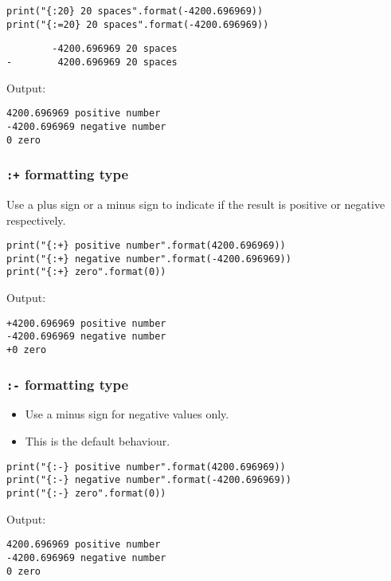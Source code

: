 \documentclass[11pt]{article}
\begin{document}
\begin{verbatim}
print("{:20} 20 spaces".format(-4200.696969))
print("{:=20} 20 spaces".format(-4200.696969))
\end{verbatim}

\begin{verbatim}
        -4200.696969 20 spaces
-        4200.696969 20 spaces
\end{verbatim}


 \noindent Output:

\begin{verbatim}
4200.696969 positive number
-4200.696969 negative number
0 zero
\end{verbatim}

\subsubsection{\texttt{:+} formatting type}
\label{sec:org0a3a92e}
Use a plus sign or a minus sign to indicate if the result is positive or negative respectively.

\begin{verbatim}
print("{:+} positive number".format(4200.696969))
print("{:+} negative number".format(-4200.696969))
print("{:+} zero".format(0))
\end{verbatim}

 \noindent Output:

\begin{verbatim}
+4200.696969 positive number
-4200.696969 negative number
+0 zero
\end{verbatim}

\subsubsection{\texttt{:-} formatting type}
\label{sec:orga4ec057}
\begin{itemize}
\item Use a minus sign for negative values only.
\item This is the default behaviour.
\end{itemize}

\begin{verbatim}
print("{:-} positive number".format(4200.696969))
print("{:-} negative number".format(-4200.696969))
print("{:-} zero".format(0))
\end{verbatim}

 \noindent Output:

\begin{verbatim}
4200.696969 positive number
-4200.696969 negative number
0 zero
\end{verbatim}
\end{document}
